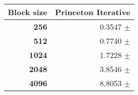\begin{tabular}{rr}\toprule
\textbf{Block size}  & \textbf{Princeton Iterative}\\\midrule
\textbf{256}  & 0.3547 $\pm$ \\
\textbf{512}  & 0.7740 $\pm$ \\
\textbf{1024}  & 1.7228 $\pm$ \\
\textbf{2048}  & 3.8546 $\pm$ \\
\textbf{4096} & 8.8053 $\pm$ \\
\bottomrule
\end{tabular}
